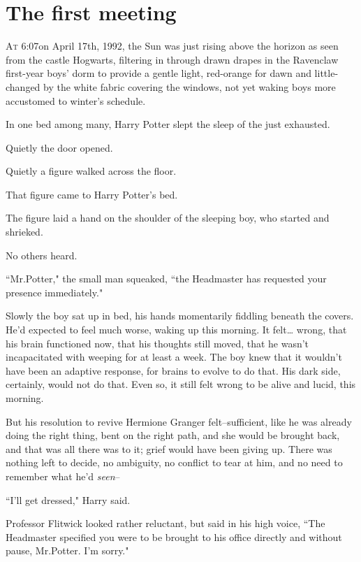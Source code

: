 
\section{The first meeting}

\lettrine{A}{t} 6:07\am on April 17th, 1992, the Sun was just rising above the horizon as seen from the castle Hogwarts, filtering in through drawn drapes in the Ravenclaw first-year boys' dorm to provide a gentle light, red-orange for dawn and little-changed by the white fabric covering the windows, not yet waking boys more accustomed to winter's schedule.

In one bed among many, Harry Potter slept the sleep of the just exhausted.

Quietly the door opened.

Quietly a figure walked across the floor.

That figure came to Harry Potter's bed.

The figure laid a hand on the shoulder of the sleeping boy, who started and shrieked.

No others heard.

``Mr.\?Potter," the small man squeaked, ``the Headmaster has requested your presence immediately."

Slowly the boy sat up in bed, his hands momentarily fiddling beneath the covers. He'd expected to feel much worse, waking up this morning. It felt{\ldots} wrong, that his brain functioned now, that his thoughts still moved, that he wasn't incapacitated with weeping for at least a week. The boy knew that it wouldn't have been an adaptive response, for brains to evolve to do that. His dark side, certainly, would not do that. Even so, it still felt wrong to be alive and lucid, this morning.

But his resolution to revive Hermione Granger felt\---sufficient, like he was already doing the right thing, bent on the right path, and she would be brought back, and that was all there was to it; grief would have been giving up. There was nothing left to decide, no ambiguity, no conflict to tear at him, and no need to remember what he'd \emph{seen}\---

``I'll get dressed," Harry said.

Professor Flitwick looked rather reluctant, but said in his high voice, ``The Headmaster specified you were to be brought to his office directly and without pause, Mr.\?Potter. I'm sorry."

